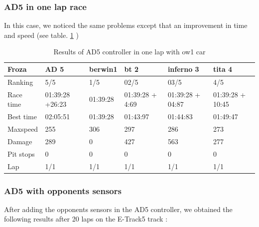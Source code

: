 \documentclass{llncs}
\begin{document}
\subsubsection{AD5 in one lap race}
In this case, we noticed the same problems except that an improvement in time and speed (see table. \ref{resultat34} )
\begin{table}[h!]
	\caption{Results of AD5 controller in one lap with ow1 car}
	\label{resultat34}
	\begin{tabular}{ |p{3cm}|p{2cm}|p{2cm}|p{2 cm}|p{2 cm}|p{2 cm}|}
		\hline
		{ \color{blue}\textbf{Froza} }&
		{ \color{red} \textbf{ AD 5} } &
		{ \color{red}\textbf{ berwin1 }}&  
		{ \color{red} \textbf{bt 2 } } &
		
		{ \color{red} \textbf{inferno 3} }
		&{ \color{red} \textbf{tita 4} }
		\\
		\hline
		Ranking  & 5/5  & 1/5 & 02/5 & 03/5& 4/5
		\\
		\hline
		Race time &  01:39:28 +26:23 &  01:39:28  &  01:39:28 + 4:69   &  01:39:28 + 04:87 &   01:39:28 + 10:45 
		\\
		\hline
		Best time & 02:05:51 & 01:39:28 & 01:43:97 & 01:44:83& 01:49:47
		\\
		\hline 
		Maxspeed & 255  & 306 & 297 & 286 & 273
		\\
		\hline
		
		Damage & 289 & 0 & 427 & 563 & 277
		\\
		\hline 
		
		
		Pit stops & 0 & 0 & 0 & 0 & 0
		\\
		\hline 
		Lap & 1/1 & 1/1  & 1/1 & 1/1& 1/1 
		\\
		\hline	
	\end{tabular} 
	
\end{table}

\subsubsection{AD5 with opponents sensors}

After adding the opponents sensors in the AD5  controller, we obtained the following results after 20 laps on the E-Track5 track :
\end{document}
